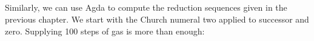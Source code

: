 \begin{fence}
\begin{code}
\\
\>[3][@{}l@{\AgdaIndent{0}}]%
\>[4]\AgdaSpace{}%
\AgdaSymbol{(}\AgdaSpace{}%
\AgdaSymbol{(}\AgdaSpace{}%
\AgdaSymbol{(}\AgdaSpace{}%
\AgdaSpace{}%
\AgdaSpace{}%
\AgdaSpace{}%
\AgdaSpace{}%
\AgdaSymbol{)))}\<%
\\
%
\>[3]\AgdaSymbol{)}\<%
\\
%
\>[3]\<%
\\
\>[0]\AgdaSymbol{\AgdaUnderscore{}}\AgdaSpace{}%
\AgdaSymbol{=}\AgdaSpace{}%
\<%
\end{code}
\end{fence}

Similarly, we can use Agda to compute the reduction sequences given in
the previous chapter. We start with the Church numeral two applied to
successor and zero. Supplying 100 steps of gas is more than enough:

